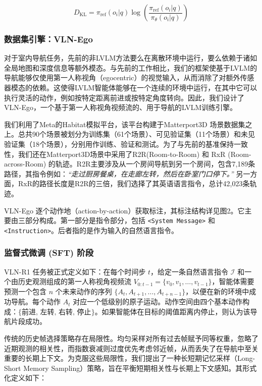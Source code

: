 \begin{equation}
D_{\text{KL}} = \pi_{\text{ref}}(o_i|q) \log\left( \frac{\pi_{\text{ref}}(o_i|q)}{\pi_\theta(o_i|q)} \right)
\end{equation}

\subsubsection{数据集引擎：VLN-Ego}

对于室内导航任务，先前的非LVLM方法要么在离散环境中运行，要么依赖于诸如全局地图和深度信息等额外模态。与先前的工作相比，我们的框架使基于LVLM的导航能够仅使用第一人称视角（egocentric）的视觉输入，从而消除了对额外传感器模态的依赖。这使得LVLM智能体能够在一个连续的环境中运行，在其中它可以执行灵活的动作，例如按特定距离前进或按特定角度转向。因此，我们设计了 VLN-Ego，一个基于第一人称视角视频流的、用于导航的LVLM训练引擎。

我们利用了Meta的Habitat模拟平台，该平台构建于Matterport3D 场景数据集之上。总共90个场景被划分为训练集（61个场景）、可见验证集（11个场景）和未见验证集（18个场景），分别用作训练、验证和测试。为了与先前的基准保持一致性，我们还在Matterport3D场景中采用了R2R(Room-to-Room) 和 RxR  (Room-across-Room) 的轨迹。R2R主要涉及从一个房间导航到另一个房间，包含7,189条路径，其指令例如：\textit{“走过厨房餐桌，在走廊左转，然后在卧室门口停下。”} 另一方面，RxR的路径长度是R2R的三倍，我们选择了其英语语言指令，总计42,023条轨迹。

VLN-Ego 逐个动作地（action-by-action）获取标注，其标注结构详见图2。它主要由三部分构成。第一部分是指令部分，包括 \texttt{<System Message>} 和 \texttt{<Instruction>}。后者指的是作为输入的自然语言指令。

\subsubsection{监督式微调 (SFT) 阶段}


VLN-R1 任务被正式定义如下：在每个时间步 $ t $，给定一条自然语言指令 $ \mathcal{I} $ 和一个由历史观测组成的第一人称视角视频流 $ V_{0:t-1} = \{v_0, v_1, \dots, v_{t-1}\} $，智能体需要预测一个包含 $ n $ 个未来动作的序列 $ \{A_t, A_{t+1}, \dots, A_{t+n-1}\} $，以便在新的环境中成功导航。每个动作 $ A_t $ 对应一个低级别的原子运动。动作空间由四个基本动作构成：$ \{\text{前进, 左转, 右转, 停止}\} $。如果智能体在目标的阈值距离内停止，则认为该导航片段成功。


传统的历史帧选择策略存在局限性。均匀采样对所有过去帧赋予同等权重，忽略了近期观测的相关性，而指数衰减则过度优先考虑邻近帧，从而丢失了在导航中至关重要的长期上下文。为克服这些局限性，我们提出了一种长短期记忆采样（Long-Short Memory Sampling）策略，旨在平衡短期相关性与长期上下文感知。其形式化定义如下：

